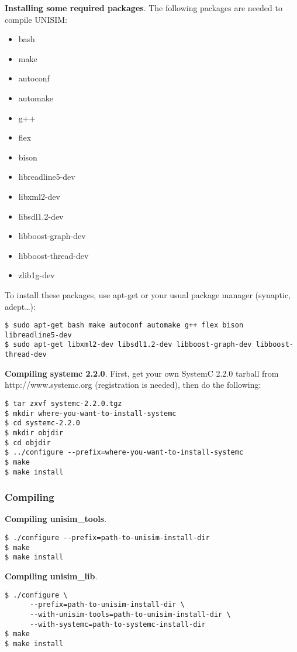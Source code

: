 \noindent \textbf{Installing some required packages}. The following packages are needed to compile UNISIM:
\begin{itemize}
\item bash
\item make
\item autoconf
\item automake
\item g++
\item flex
\item bison
\item libreadline5-dev
\item libxml2-dev
\item libsdl1.2-dev
\item libboost-graph-dev
\item libboost-thread-dev
\item zlib1g-dev
\end{itemize}

To install these packages, use apt-get or your usual package manager (synaptic, adept\ldots):
\begin{verbatim}
$ sudo apt-get bash make autoconf automake g++ flex bison libreadline5-dev
$ sudo apt-get libxml2-dev libsdl1.2-dev libboost-graph-dev libboost-thread-dev
\end{verbatim}

\noindent \textbf{Compiling systemc 2.2.0}. First, get your own SystemC 2.2.0 tarball from http://www.systemc.org (registration is needed), then do the following:

\begin{verbatim}
$ tar zxvf systemc-2.2.0.tgz
$ mkdir where-you-want-to-install-systemc
$ cd systemc-2.2.0
$ mkdir objdir
$ cd objdir
$ ../configure --prefix=where-you-want-to-install-systemc
$ make
$ make install
\end{verbatim}

\subsubsection{Compiling}

\noindent \textbf{Compiling unisim\_tools}.

\begin{verbatim}
$ ./configure --prefix=path-to-unisim-install-dir
$ make
$ make install
\end{verbatim}

\noindent \textbf{Compiling unisim\_lib}.

\begin{verbatim}
$ ./configure \
      --prefix=path-to-unisim-install-dir \
      --with-unisim-tools=path-to-unisim-install-dir \
      --with-systemc=path-to-systemc-install-dir
$ make
$ make install
\end{verbatim}

